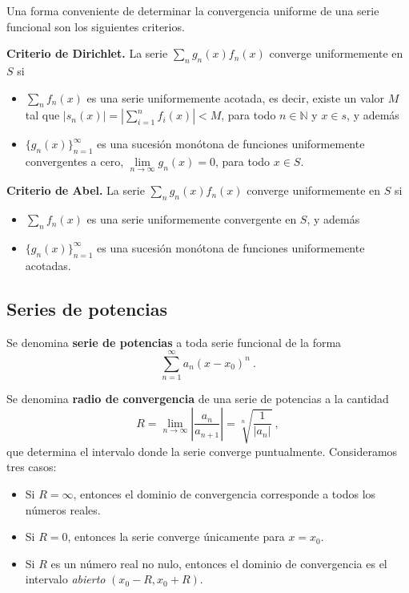 Una forma conveniente de determinar la convergencia uniforme de una serie funcional son los siguientes criterios.
\begin{teorema}{\textbf{Criterio de Dirichlet.}}
    La serie $\sum\limits_n g_n(x)f_n(x)$ converge uniformemente en $S$ si 
    \begin{itemize}
        \item $\sum\limits_n f_n(x)$ es una serie uniformemente acotada, es decir, existe un valor $M$ tal que $|s_n(x)| = \left| \sum\limits_{i=1}^n f_i(x)  \right| < M$, para todo $n \in \mathbb{N}$ y $x \in s$, y además 
        \item $\{ g_n(x) \}_{n=1}^\infty$ es una sucesión monótona de funciones uniformemente convergentes a cero, $\lim\limits_{n \to \infty} g_n(x) = 0 $, para todo $x \in S$.
    \end{itemize}
\end{teorema}

\begin{teorema}{\textbf{Criterio de Abel.}}
    La serie $\sum\limits_n g_n(x)f_n(x)$ converge uniformemente en $S$ si 
    \begin{itemize}
        \item $\sum\limits_n f_n(x)$ es una serie uniformemente convergente en $S$, y además 
        \item $\{ g_n(x) \}_{n=1}^\infty$ es una sucesión monótona de funciones uniformemente acotadas.
    \end{itemize}
\end{teorema}

\subsection{Series de potencias}

\begin{defi}
    Se denomina \textbf{serie de potencias} a toda serie funcional de la forma 
    \begin{equation}
        \sum_{n=1}^\infty a_n (x-x_0)^n \ .
    \end{equation}
\end{defi}

\begin{defi}
    Se denomina \textbf{radio de convergencia} de una serie de potencias a la cantidad 
    \begin{equation}
        R = \lim_{n \to \infty} \left| \frac{a_n}{a_{n+1}} \right| = \sqrt[n]{\frac{1}{|a_n|}} \ ,
    \end{equation}
    que determina el intervalo donde la serie converge puntualmente. Consideramos tres casos:
    \begin{itemize}
        \item Si $R = \infty$, entonces el dominio de convergencia corresponde a todos los números reales.
        \item Si $R = 0$, entonces la serie converge únicamente para $x = x_0$.
        \item Si $R$ es un número real no nulo, entonces el dominio de convergencia es el intervalo \emph{abierto} $(x_0 - R, x_0 + R)$.
    \end{itemize}
\end{defi}

